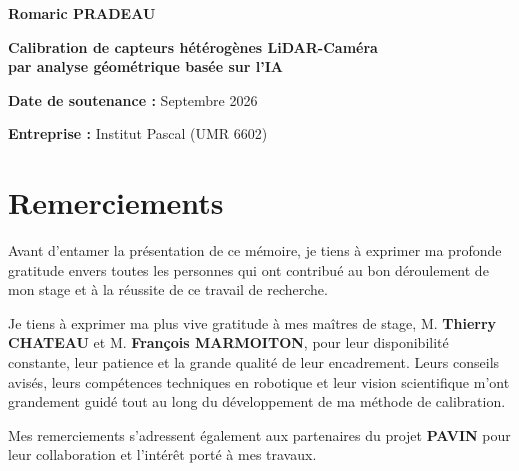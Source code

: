 \documentclass[12pt,a4paper,oneside]{report}
\begin{document}
\begin{titlepage}
    {\large \textbf{Romaric PRADEAU} \par}
    \vspace{0.8cm}
    {\LARGE \textbf{Calibration de capteurs hétérogènes LiDAR-Caméra \\ par analyse géométrique basée sur l'IA} \par}
    
    \vfill
    
    \begin{flushleft}
        \large
        \textbf{Date de soutenance :} Septembre 2026 \par
        \vspace{0.2cm}
        \textbf{Entreprise :} Institut Pascal (UMR 6602)
    \end{flushleft}
    
\end{titlepage}

\thispagestyle{empty} %

\chapter*{Remerciements}
\thispagestyle{empty} %

Avant d'entamer la présentation de ce mémoire, je tiens à exprimer ma profonde gratitude envers toutes les personnes qui ont contribué au bon déroulement de mon stage et à la réussite de ce travail de recherche.

Je tiens à exprimer ma plus vive gratitude à mes maîtres de stage, M. \textbf{Thierry CHATEAU} et M. \textbf{François MARMOITON}, pour leur disponibilité constante, leur patience et la grande qualité de leur encadrement. Leurs conseils avisés, leurs compétences techniques en robotique et leur vision scientifique m'ont grandement guidé tout au long du développement de ma méthode de calibration.

Mes remerciements s'adressent également aux partenaires du projet \textbf{PAVIN} pour leur collaboration et l'intérêt porté à mes travaux.
\end{document}
